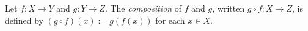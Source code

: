 \guard



\begin{defn}
\label{defn:functionComposition}
  Let $f:X\to Y$ and $g:Y\to Z$.
  The \emph{composition} of $f$ and $g$, written $g\circ f:X\to Z$, is defined by $(g\circ f )(x) := g(f(x))$ for each $x\in X$.
\end{defn}
